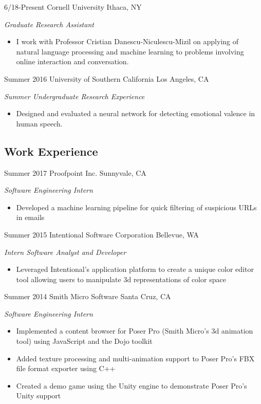 \documentclass[]{friggeri-cv} %
\begin{document}
\begin{entrylist}

\entry
{6/18-Present}
{Cornell University}
{Ithaca, NY}
{\emph{Graduate Research Assistant}
\begin{itemize}
\item I work with Professor Cristian Danescu-Niculescu-Mizil on applying of natural language processing and machine learning to problems involving online interaction and conversation.
\end{itemize}}

\entry
{Summer 2016}
{University of Southern California}
{Los Angeles, CA}
{\emph{Summer Undergraduate Research Experience}
\begin{itemize}
\item Designed and evaluated a neural network for detecting emotional valence in human speech.
\end{itemize}}

\end{entrylist}

\subsection{Work Experience}

\begin{entrylist}


\entry
{Summer 2017}
{Proofpoint Inc.}
{Sunnyvale, CA}
{\emph{Software Engineering Intern}
\begin{itemize}
\item Developed a machine learning pipeline for quick filtering of suspicious URLs in emails
\end{itemize}}

\entry
{Summer 2015}
{Intentional Software Corporation}
{Bellevue, WA}
{\emph{Intern Software Analyst and Developer}
\begin{itemize}
\item Leveraged Intentional's application platform to create a unique color editor tool allowing users to manipulate 3d representations of color space
\end{itemize}}

\entry
{Summer 2014}
{Smith Micro Software}
{Santa Cruz, CA}
{\emph{Software Engineering Intern}
\begin{itemize}
\item Implemented a content browser for Poser Pro (Smith Micro's 3d animation tool) using JavaScript
and the Dojo toolkit
\item Added texture processing and multi-animation support to Poser Pro's FBX file format exporter using C++
\item Created a demo game using the Unity engine to demonstrate Poser Pro's Unity support
\end{itemize}}


\end{entrylist}
\end{document}
